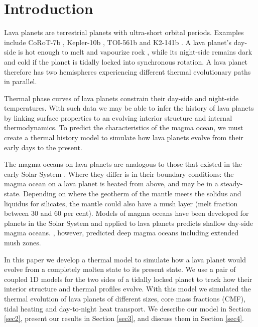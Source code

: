 \documentclass[fleqn,usenatbib]{mnras}
\begin{document}

\section{Introduction}  \label{sec1}

Lava planets are terrestrial planets with ultra-short orbital periods. Examples include CoRoT-7b \citep{Leger2009}, Kepler-10b \citep{Batalha2011}, TOI-561b \citep{Patel2023} and K2-141b \citep{Barragan2018, Malavolta2018}. A lava planet's day-side is hot enough to melt and vapourize rock \citep{Schaefer2009}, while its night-side remains dark and cold if the planet is tidally locked into synchronous rotation. A lava planet therefore has two hemispheres experiencing different thermal evolutionary paths in parallel. 

Thermal phase curves of lava planets constrain their day-side and night-side temperatures. With such data we may be able to infer the history of lava planets by linking surface properties to an evolving interior structure and internal thermodynamics. To predict the characteristics of the magma ocean, we must create a thermal history model to simulate how lava planets evolve from their early days to the present. 

The magma oceans on lava planets are analogous to those that existed in the early Solar System \citep{Elkins2012, solo2000}. Where they differ is in their boundary conditions: the magma ocean on a lava planet is heated from above, and may be in a steady-state. Depending on where the geotherm of the mantle meets the solidus and liquidus for silicates, the mantle could also have a mush layer (melt fraction between 30 and 60 per cent). Models of magma oceans have been developed for planets in the Solar System \citep{Elkins2012} and applied to lava planets \citep{chao2021, Leger2011, Kite2016, Nguyen2020} predicts shallow day-side magma oceans. \cite{Boukare2022}, however, predicted deep magma oceans including extended mush zones. 

In this paper we develop a thermal model to simulate how a lava planet would evolve from a completely molten state to its present state. We use a pair of coupled 1D models for the two sides of a tidally locked planet to track how their interior structure and thermal profiles evolve. With this model we simulated the thermal evolution of lava planets of different sizes, core mass fractions (CMF), tidal heating and day-to-night heat transport. We describe our model in Section \ref{sec2}, present our results in Section \ref{sec3}, and discuss them in Section \ref{sec4}. 
\end{document}

